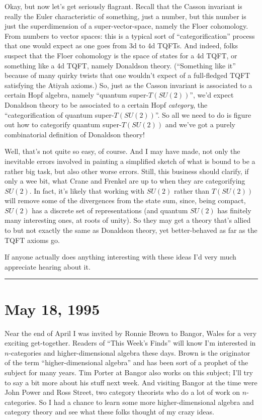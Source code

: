 \documentclass{article}
\begin{document}
Okay, but now let's get seriously flagrant. Recall that the Casson
invariant is really the Euler characteristic of something, just a
number, but this number is just the superdimension of a
super-vector-space, namely the Floer cohomology. From numbers to vector
spaces: this is a typical sort of ``categorification'' process that one
would expect as one goes from 3d to 4d TQFTs. And indeed, folks suspect
that the Floer cohomology is the space of states for a 4d TQFT, or
something like a 4d TQFT, namely Donaldson theory. (``Something like
it'' because of many quirky twists that one wouldn't expect of a
full-fledged TQFT satisfying the Atiyah axioms.) So, just as the Casson
invariant is associated to a certain Hopf algebra, namely ``quantum
super-\(T(SU(2))\)'', we'd expect Donaldson theory to be associated to a
certain Hopf \emph{category}, the ``categorification of quantum
super-\(T(SU(2))\)''. So all we need to do is figure out how to
categorify quantum super-\(T(SU(2))\) and we've got a purely
combinatorial definition of Donaldson theory!

Well, that's not quite so easy, of course. And I may have made, not only
the inevitable errors involved in painting a simplified sketch of what
is bound to be a rather big task, but also other worse errors. Still,
this business should clarify, if only a wee bit, what Crane and Frenkel
are up to when they are categorifying \(SU(2)\). In fact, it's likely
that working with \(SU(2)\) rather than \(T(SU(2))\) will remove some of
the divergences from the state sum, since, being compact, \(SU(2)\) has
a discrete set of representations (and quantum \(SU(2)\) has finitely
many interesting ones, at roots of unity). So they may get a theory
that's allied to but not exactly the same as Donaldson theory, yet
better-behaved as far as the TQFT axioms go.

If anyone actually does anything interesting with these ideas I'd very
much appreciate hearing about it.

\begin{center}\rule{0.5\linewidth}{0.5pt}\end{center}
\hypertarget{week53}{%
\section{May 18, 1995}\label{week53}}

Near the end of April I was invited by Ronnie Brown to Bangor, Wales for
a very exciting get-together. Readers of ``This Week's Finds'' will know
I'm interested in \(n\)-categories and higher-dimensional algebra these
days. Brown is the originator of the term ``higher-dimensional algebra''
and has been sort of a prophet of the subject for many years. Tim Porter
at Bangor also works on this subject; I'll try to say a bit more about
his stuff next week. And visiting Bangor at the time were John Power and
Ross Street, two category theorists who do a lot of work on
\(n\)-categories. So I had a chance to learn some more
higher-dimensional algebra and category theory and see what these folks
thought of my crazy ideas.
\end{document}
